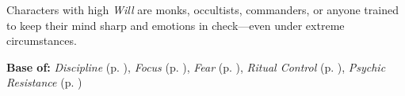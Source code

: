 Characters with high \emph{Will} are monks, occultists, commanders, or anyone trained to keep their mind sharp and emotions in check—even under extreme circumstances.

\vspace{0.5\baselineskip}
\noindent\textbf{Base of:} \emph{Discipline} (p. \pageref{skill:discipline}), \emph{Focus} (p. \pageref{skill:focus}), \emph{Fear} (p. \pageref{skill:fear}), \emph{Ritual Control} (p. \pageref{skill:ritual-control}), \emph{Psychic Resistance} (p. \pageref{skill:psychic-resistance})



